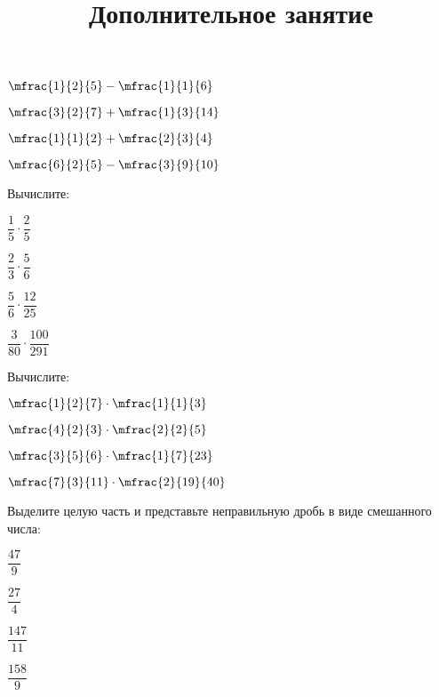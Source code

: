 \begin{listofex}
\begin{enumcols}[itemcolumns=4]
		\item \( \mfrac{1}{2}{5}-\mfrac{1}{1}{6} \)
		\item \( \mfrac{3}{2}{7}+\mfrac{1}{3}{14} \)
		\item \( \mfrac{1}{1}{2}+\mfrac{2}{3}{4} \)
		\item \( \mfrac{6}{2}{5}-\mfrac{3}{9}{10} \)	
	\end{enumcols}
	\item Вычислите:
		\begin{enumcols}[itemcolumns=4]
		\item \( \dfrac{1}{5}\cdot\dfrac{2}{5} \)
		\item \( \dfrac{2}{3}\cdot\dfrac{5}{6} \)
		\item \( \dfrac{5}{6}\cdot\dfrac{12}{25} \)
		\item \( \dfrac{3}{80}\cdot\dfrac{100}{291} \)
	\end{enumcols}
	\item Вычислите:
		\begin{enumcols}[itemcolumns=4]
		\item \( \mfrac{1}{2}{7}\cdot\mfrac{1}{1}{3} \)
		\item \( \mfrac{4}{2}{3}\cdot\mfrac{2}{2}{5} \)
		\item \( \mfrac{3}{5}{6}\cdot\mfrac{1}{7}{23} \)
		\item \( \mfrac{7}{3}{11}\cdot\mfrac{2}{19}{40} \)
	\end{enumcols}
	\item Выделите целую часть и представьте неправильную дробь в виде смешанного числа:
		\begin{enumcols}[itemcolumns=4]
		\item \( \dfrac{47}{9} \)
		\item \( \dfrac{27}{4} \)
		\item \( \dfrac{147}{11} \)
		\item \( \dfrac{158}{9} \)
	\end{enumcols}
\end{listofex}
%	
%	
\newpage
\title{Дополнительное занятие}
